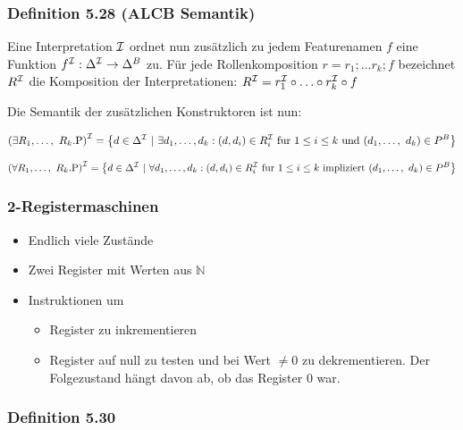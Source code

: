 \subsubsection{Definition 5.28 (ALCB
Semantik)}\label{definition-5.28-alcb-semantik}

Eine Interpretation $\mathcal{I}$ ordnet nun zusätzlich zu jedem Featurenamen
$f$ eine Funktion $f^{\mathcal{I}}:\Delta^{\mathcal{I}} \rightarrow \Delta^{B}$ zu. Für
jede Rollenkomposition $r = r_1;\ldots r_{k};f$ bezeichnet $R^{\mathcal{I}}$
die Komposition der Interpretationen:
$R^{\mathcal{I}} = r_1^{\mathcal{I}} \circ \ldots \circ r_{k}^{\mathcal{I}} \circ f$

Die Semantik der zusätzlichen Konstruktoren ist nun:

\[\left( \exists R_1,\ldots,\ R_{k}\text{.P} \right)^\MI = \left\{ d \in \Delta^\MI\ |\ \exists d_1,\ldots,d_{k}:\left( d,d_{i} \right) \in R_{i}^\MI\ \mathrm{fur}\ 1 \leq i \leq k\ \mathrm{\text{und}}\ \left( d_1,\ldots,\ d_{k} \right) \in P^{B} \right\}\]

\[\left( \forall R_1,\ldots,\ R_{k}\text{.P} \right)^\MI = \left\{ d \in \Delta^\MI\ |\ \forall d_1,\ldots,d_{k}:\left( d,d_{i} \right) \in R_{i}^\MI\ \mathrm{fur}\ 1 \leq i \leq k\ \mathrm{\text{impliziert}}\ \left( d_1,\ldots,\ d_{k} \right) \in P^{B} \right\}\]

\subsubsection{2-Registermaschinen}\label{registermaschinen}

\begin{itemize}
\item
  Endlich viele Zustände
\item
  Zwei Register mit Werten aus $\mathbb{N}$
\item
  Instruktionen um

  \begin{itemize}
  \item
    Register zu inkrementieren
  \item
    Register auf null zu testen und bei Wert $\neq 0$ zu
    dekrementieren. Der Folgezustand hängt davon ab, ob das Register
    $0$ war.
  \end{itemize}
\end{itemize}

\subsubsection{Definition 5.30}\label{definition-5.30}

